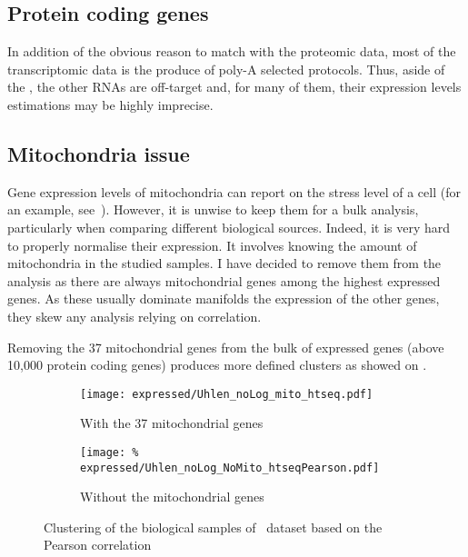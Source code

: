 \subsection{Protein coding genes}
In addition of the obvious reason to match with the proteomic data,
most of the transcriptomic data is the produce of poly-A selected protocols.
Thus, aside of the \mRNAs, the other \glspl{RNA} are off-target
and, for many of them,
their expression levels estimations may be highly imprecise.

\subsection{Mitochondria issue}\label{subsec:mito}

Gene expression levels of mitochondria can report on the stress level of a cell
(for an example, see~).
However, it is unwise to keep them for a bulk analysis, particularly when
comparing different biological sources.
Indeed, it is very hard to properly normalise their expression.
It involves knowing the amount of mitochondria in the studied samples.
I have decided to remove them from the analysis
as there are always mitochondrial genes among the highest expressed genes.
As these usually dominate manifolds the expression of the other genes,
they skew any analysis relying on correlation.

Removing the 37 mitochondrial genes from the bulk of expressed genes
(above 10,000 protein coding genes) produces more defined clusters as showed on
.

\begin{figure}
    \centering
    \begin{subfigure}[b]{0.75\textwidth}
        \centering
        \texttt{[image: expressed/Uhlen\_noLog\_mito\_htseq.pdf]}
        \caption{With the 37 mitochondrial genes}\label{fig:withMito}
    \end{subfigure}

    \begin{subfigure}[b]{0.75\textwidth}
        \centering
        \texttt{[image: \%
            expressed/Uhlen\_noLog\_NoMito\_htseqPearson.pdf]}
        \caption{Without the mitochondrial genes}\label{fig:NoMito}
    \end{subfigure}
    \caption{Clustering of the biological samples of \uhlen\
    dataset based on the Pearson correlation}\label{fig:MitoNomito}
\end{figure}


